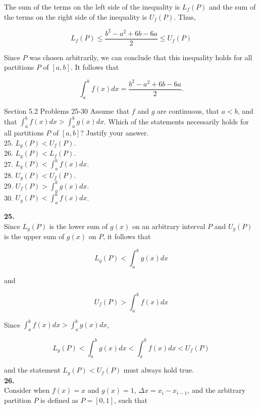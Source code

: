 \documentclass{article}
\begin{document}
    The sum of the terms on the left side of the inequality is $L_f (P)$ and the sum of the terms on the right side of the inequality is $U_f (P)$. Thus,

    \[
        L_f (P) \leq \frac{b^2-a^2 + 6b-6a}{2} \leq U_f (P)
    \]

    Since $P$ was chosen arbitrarily, we can conclude that this inequality holds for all partitions $P$ of $[a,b]$. It follows that

    \[
        \int^b_a f(x)dx = \frac{b^2-a^2+6b-6a}{2}.
    \]



    \begin{tbhtheorem}{Section 5.2 Problems 25-30}
        Assume that $f$ and $g$ are continuous, that $a<b$, and that $\int^b_a f(x)dx > \int^b_a g(x)dx$. Which of the statements necessarily holds for all partitions $P$ of $[a,b]$? Justify your answer. \\

        25. $L_g (P) < U_f (P)$. \\
        26. $L_g (P) < L_f (P)$. \\
        27. $L_g (P) < \int^b_a f(x)dx$. \\
        28. $U_g (P) < U_f (P)$. \\
        29. $U_f (P) > \int^b_a g(x)dx$. \\
        30. $U_g (P) < \int^b_a f(x)dx$.
    \end{tbhtheorem}

    \textbf{25.} \\
    Since $L_g (P)$ is the lower sum of $g(x)$ on an arbitrary interval $P$ and $U_g (P)$ is the upper sum of $g(x)$ on $P$, it follows that

    \[
        L_g (P) < \int^b_a g(x)dx
    \]

    and

    \[
        U_f (P) > \int^b_a f(x)dx
    \]

    Since $\int^b_a f(x)dx > \int^b_a g(x)dx$,

    \[
        L_g (P) < \int^b_a g(x)dx < \int^b_a f(x)dx < U_f (P)
    \]

    and the statement $L_g (P) < U_f (P)$ must always hold true. \\

    \textbf{26.} \\
    Consider when $f(x)=x$ and $g(x)=1$, $\Delta x = x_i - x_{i-1}$, and the arbitrary partition $P$ is defined as $P=[0,1]$, such that
\end{document}
